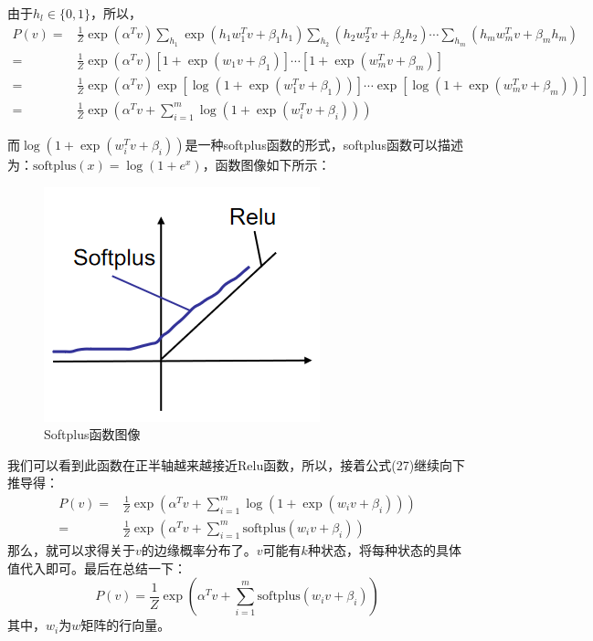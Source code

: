 \documentclass[a4paper]{article}
\begin{document}
由于$h_l \in\{0,1\}$，所以，
\begin{equation}
\begin{split}
    P(v) = &\frac{1}{Z} \exp(\alpha^T v) \sum_{h_1}\exp (h_1w_1^{T}v + \beta_1 h_1) \sum_{h_2}(h_2w_2^{T}v + \beta_2 h_2) \cdots \sum_{h_m}(h_mw_m^{T}v + \beta_m h_m) \\
    = &\frac{1}{Z} \exp(\alpha^T v) \left[ 1+\exp(w_1v+\beta_1) \right]\cdots \left[ 1+\exp(w_m^{T}v+\beta_m) \right] \\
    = & \frac{1}{Z} \exp(\alpha^T v) \exp \left[\log ( 1+\exp(w_1^{T}v+\beta_1)) \right]\cdots \exp \left[\log ( 1+\exp(w_m^{T}v+\beta_m)) \right] \\
    = & \frac{1}{Z} \exp\left(\alpha^T v + \sum_{i=1}^m \log ( 1+\exp(w_i^{T}v+\beta_i)) \right)
\end{split}
\end{equation}

而$\log ( 1+\exp(w_i^{T}v+\beta_i))$是一种softplus函数的形式，softplus函数可以描述为：$\mathrm{softplus}(x) = \log(1+e^x)$，函数图像如下所示：
\begin{figure}[H]
    \centering
    \includegraphics[width=.45\textwidth]{微信图片_20200301132709.png}
    \caption{Softplus函数图像}
\end{figure}
我们可以看到此函数在正半轴越来越接近Relu函数，所以，接着公式(27)继续向下推导得：
\begin{equation}
\begin{split}
    P(v) = & \frac{1}{Z} \exp\left(\alpha^T v + \sum_{i=1}^m \log ( 1+\exp(w_iv+\beta_i)) \right) \\
    = &\frac{1}{Z} \exp\left(\alpha^T v + \sum_{i=1}^m \mathrm{softplus} ( w_iv+\beta_i) \right)
\end{split}
\end{equation}
那么，就可以求得关于$v$的边缘概率分布了。$v$可能有$k$种状态，将每种状态的具体值代入即可。最后在总结一下：
\begin{equation}
    P(v)
    = \frac{1}{Z} \exp\left(\alpha^T v + \sum_{i=1}^m \mathrm{softplus} ( w_iv+\beta_i) \right)
\end{equation}
其中，$w_i$为$w$矩阵的行向量。
\end{document}
